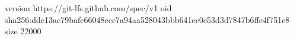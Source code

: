 version https://git-lfs.github.com/spec/v1
oid sha256:dde13ac79bafc66048ccc7a94aa528043bbb641ec0e53d3d7847b6ffe4f751c8
size 22000

